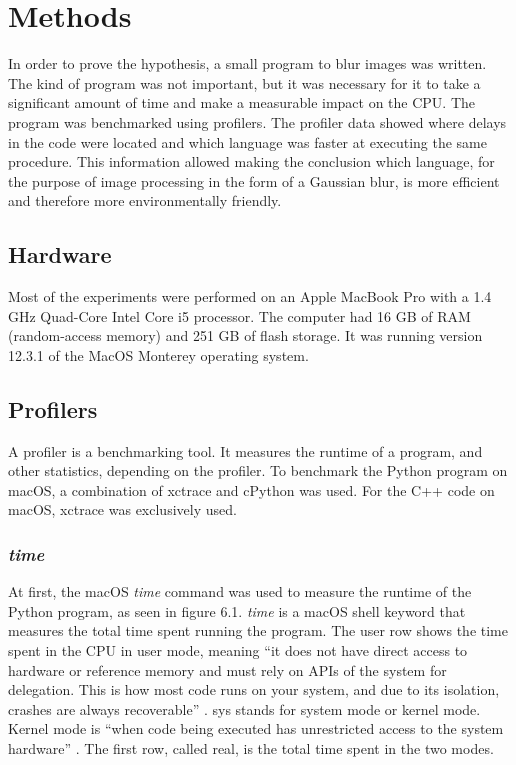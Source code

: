 \chapter{Methods}
In order to prove the hypothesis, a small program to blur images was written. The kind of program was not important, but it was necessary for it to take a significant amount of time and make a measurable impact on the CPU.
The program was benchmarked using profilers. The profiler data showed where delays in the code were located and which language was faster at executing the same procedure. This information allowed making the conclusion which language, for the purpose of image processing in the form of a Gaussian blur, is more efficient and therefore more environmentally friendly.

\section{Hardware}
Most of the experiments were performed on an Apple MacBook Pro with a 1.4 GHz Quad-Core Intel Core i5 processor. The computer had 16 GB of RAM (random-access memory) and 251 GB of flash storage. It was running version 12.3.1 of the MacOS Monterey operating system.

\section{Profilers}
A profiler is a benchmarking tool. It measures the runtime of a program, and other statistics, depending on the profiler. To benchmark the Python program on macOS, a combination of xctrace and cPython was used. For the C++ code on macOS, xctrace was exclusively used.

\subsection{\textit{time}}
At first, the macOS \textit{time} command was used to measure the runtime of the Python program, as seen in figure 6.1.
\textit{time} is a macOS shell keyword that measures the total time spent running the program. The user row shows the time spent in the CPU in user mode, meaning “it does not have direct access to hardware or reference memory and must rely on APIs of the system for delegation. This is how most code runs on your system, and due to its isolation, crashes are always recoverable” \cite{time}. sys stands for system mode or kernel mode. Kernel mode is “when code being executed has unrestricted access to the system hardware” \cite{time}. The first row, called real, is the total time spent in the two modes.

